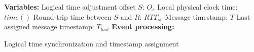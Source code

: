 {%
%


\begin{algorithm}[t]
\DontPrintSemicolon
\textbf{Variables:}\;
Logical time adjustment offset $S$: $O_{s}$\;
Local physical clock time: $time()$\;
Round-trip time between $S$ and $R$: $RTT_{sr}$\;
Message timestamp: $T$\;
Last assigned message timestamp: $T_{last}$ \;
\;
\textbf{Event processing:}\;
\caption{Logical time synchronization and timestamp assignment}
\label{alg:clock}
\end{algorithm}

}
